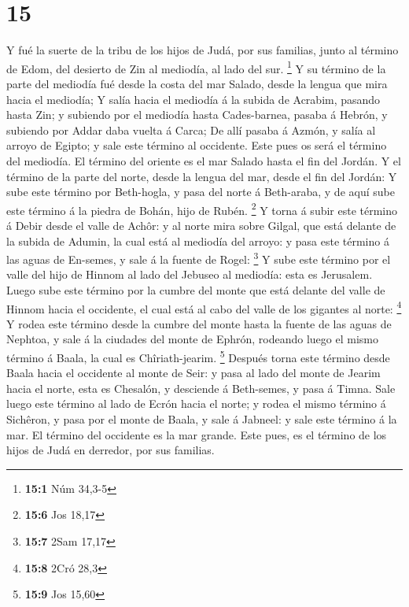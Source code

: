 \hypertarget{section-14}{%
\section{15}\label{section-14}}

 Y fué la suerte de la tribu de los hijos de Judá, por sus
familias, junto al término de Edom, del desierto de Zin al mediodía, al
lado del sur. \footnote{\textbf{15:1} Núm 34,3-5}  Y su
término de la parte del mediodía fué desde la costa del mar Salado,
desde la lengua que mira hacia el mediodía;  Y salía hacia
el mediodía á la subida de Acrabim, pasando hasta Zin; y subiendo por el
mediodía hasta Cades-barnea, pasaba á Hebrón, y subiendo por Addar daba
vuelta á Carca;  De allí pasaba á Azmón, y salía al arroyo
de Egipto; y sale este término al occidente. Este pues os será el
término del mediodía.  El término del oriente es el mar
Salado hasta el fin del Jordán. Y el término de la parte del norte,
desde la lengua del mar, desde el fin del Jordán:  Y sube
este término por Beth-hogla, y pasa del norte á Beth-araba, y de aquí
sube este término á la piedra de Bohán, hijo de Rubén. \footnote{\textbf{15:6}
  Jos 18,17}  Y torna á subir este término á Debir desde
el valle de Achôr: y al norte mira sobre Gilgal, que está delante de la
subida de Adumin, la cual está al mediodía del arroyo: y pasa este
término á las aguas de En-semes, y sale á la fuente de Rogel:
\footnote{\textbf{15:7} 2Sam 17,17}  Y sube este término
por el valle del hijo de Hinnom al lado del Jebuseo al mediodía: esta es
Jerusalem. Luego sube este término por la cumbre del monte que está
delante del valle de Hinnom hacia el occidente, el cual está al cabo del
valle de los gigantes al norte: \footnote{\textbf{15:8} 2Cró 28,3}
 Y rodea este término desde la cumbre del monte hasta la
fuente de las aguas de Nephtoa, y sale á la ciudades del monte de
Ephrón, rodeando luego el mismo término á Baala, la cual es
Chîriath-jearim. \footnote{\textbf{15:9} Jos 15,60} 
Después torna este término desde Baala hacia el occidente al monte de
Seir: y pasa al lado del monte de Jearim hacia el norte, esta es
Chesalón, y desciende á Beth-semes, y pasa á Timna.  Sale
luego este término al lado de Ecrón hacia el norte; y rodea el mismo
término á Sichêron, y pasa por el monte de Baala, y sale á Jabneel: y
sale este término á la mar.  El término del occidente es
la mar grande. Este pues, es el término de los hijos de Judá en
derredor, por sus familias.

